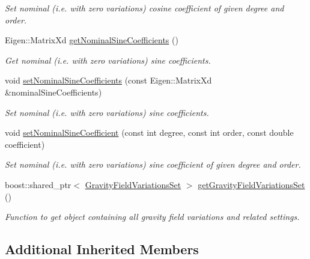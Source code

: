 \begin{DoxyCompactItemize}
\begin{DoxyCompactList}\small\item\em Set nominal (i.\+e. with zero variations) cosine coefficient of given degree and order. \end{DoxyCompactList}\item 
Eigen\+::\+Matrix\+Xd \hyperlink{classtudat_1_1gravitation_1_1TimeDependentSphericalHarmonicsGravityField_a18e35b1aa0964d8fb0a5f0e5fa001f7e}{get\+Nominal\+Sine\+Coefficients} ()
\begin{DoxyCompactList}\small\item\em Get nominal (i.\+e. with zero variations) sine coefficients. \end{DoxyCompactList}\item 
void \hyperlink{classtudat_1_1gravitation_1_1TimeDependentSphericalHarmonicsGravityField_a436fcab37a159058ddbc9596db756bdf}{set\+Nominal\+Sine\+Coefficients} (const Eigen\+::\+Matrix\+Xd \&nominal\+Sine\+Coefficients)
\begin{DoxyCompactList}\small\item\em Set nominal (i.\+e. with zero variations) sine coefficients. \end{DoxyCompactList}\item 
void \hyperlink{classtudat_1_1gravitation_1_1TimeDependentSphericalHarmonicsGravityField_a7cbad34b609e5fc7ea747a5f14eaabd0}{set\+Nominal\+Sine\+Coefficient} (const int degree, const int order, const double coefficient)
\begin{DoxyCompactList}\small\item\em Set nominal (i.\+e. with zero variations) sine coefficient of given degree and order. \end{DoxyCompactList}\item 
boost\+::shared\+\_\+ptr$<$ \hyperlink{classtudat_1_1gravitation_1_1GravityFieldVariationsSet}{Gravity\+Field\+Variations\+Set} $>$ \hyperlink{classtudat_1_1gravitation_1_1TimeDependentSphericalHarmonicsGravityField_a2c3d2908aa7a758c638451f9bac78eb9}{get\+Gravity\+Field\+Variations\+Set} ()
\begin{DoxyCompactList}\small\item\em Function to get object containing all gravity field variations and related settings. \end{DoxyCompactList}\end{DoxyCompactItemize}
\subsection*{Additional Inherited Members}


